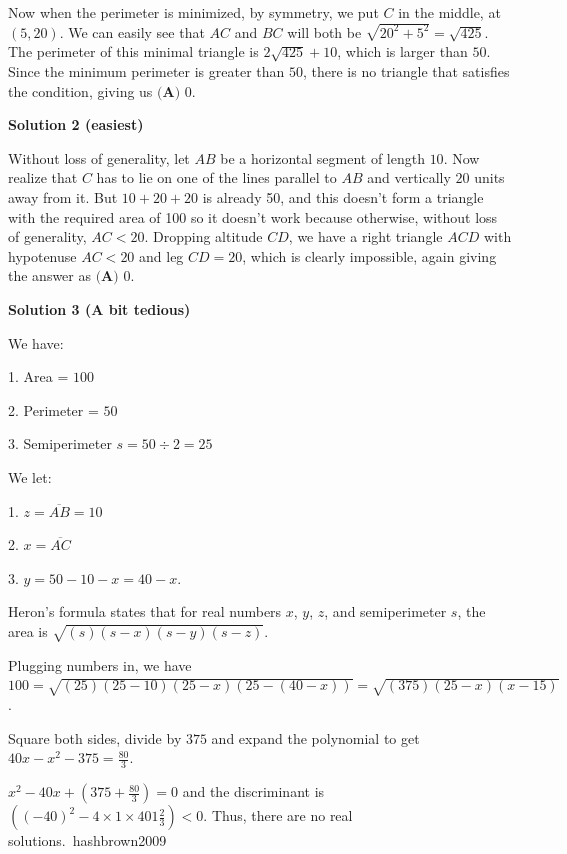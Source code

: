 \begin{enumerate}
 Now when the perimeter is minimized, by symmetry, we put $C$ in the middle, at $(5, 20)$. We can easily see that $AC$ and $BC$ will both be $\sqrt{20^2+5^2} = \sqrt{425}$. The perimeter of this minimal triangle is $2\sqrt{425} + 10$, which is larger than $50$. Since the minimum perimeter is greater than $50$, there is no triangle that satisfies the condition, giving us $\boxed{\textbf{(A) }0}$.

 



\textbf{Solution 2 (easiest)}

Without loss of generality, let $AB$ be a horizontal segment of length $10$. Now realize that $C$ has to lie on one of the lines parallel to $AB$ and vertically $20$ units away from it. But $10+20+20$ is already 50, and this doesn't form a triangle with the required area of 100 so it doesn't work because otherwise, without loss of generality, $AC<20$. Dropping altitude $CD$, we have a right triangle $ACD$ with hypotenuse $AC<20$ and leg $CD=20$, which is clearly impossible, again giving the answer as $\boxed{\textbf{(A) }0}$.

 



\textbf{Solution 3 (A bit tedious)}

We have:

 1. Area = $100$

 2. Perimeter = $50$

 3. Semiperimeter $s = 50 \div 2 = 25$

 We let:

 1. $z = \overline{AB} = 10$

 2. $x = \overline{AC}$

 3. $y = 50-10-x = 40-x$.

 
Heron's formula states that for real numbers $x$, $y$, $z$, and semiperimeter $s$, the area is $\sqrt{(s)(s-x)(s-y)(s-z)}$.

 Plugging numbers in, we have $100 = \sqrt{(25)(25-10)(25-x)(25-(40-x))} = \sqrt{(375)(25-x)(x-15)}$.

 
Square both sides, divide by $375$ and expand the polynomial to get $40x - x^2 - 375 = \frac{80}{3}$.

 
$x^2 - 40x + \left(375 + \frac{80}{3}\right) = 0$ and the discriminant is $\left((-40)^2 - 4 \times 1 \times 401 \frac{2}{3}\right) < 0$. Thus, there are no real solutions.~hashbrown2009

 




\end{enumerate}
